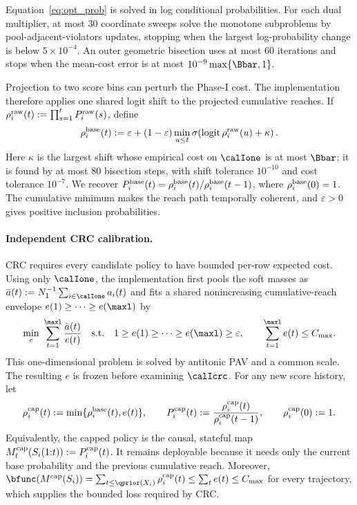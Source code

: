 Equation~\eqref{eq:opt_prob} is solved in log conditional probabilities. For
each dual multiplier, at most \(30\) coordinate sweeps solve the monotone
subproblems by pool-adjacent-violators updates, stopping when the largest
log-probability change is below \(5\times10^{-4}\). An outer geometric
bisection uses at most \(60\) iterations and stops when the mean-cost error is
at most \(10^{-9}\max\{\Bbar,1\}\).

Projection to two score bins can perturb the Phase-I cost. The implementation
therefore applies one shared logit shift to the projected cumulative reaches.
If \(\rho_i^{\rm raw}(t):=\prod_{s=1}^tP_i^{\rm raw}(s)\), define
\begin{equation}
    \rho_i^{\rm base}(t)
    :=\varepsilon+(1-\varepsilon)
      \min_{u\leq t}
      \sigma\!\left(\operatorname{logit}\rho_i^{\rm raw}(u)+\kappa\right).
    \label{eq:lpb_impl_cumulative_correction}
\end{equation}
Here \(\kappa\) is the largest shift whose empirical cost on \(\calIone\) is
at most \(\Bbar\); it is found by at most \(80\) bisection steps, with shift
tolerance \(10^{-10}\) and cost tolerance \(10^{-7}\). We recover
\(P_i^{\rm base}(t)=\rho_i^{\rm base}(t)/\rho_i^{\rm base}(t-1)\), where
\(\rho_i^{\rm base}(0)=1\). The cumulative minimum makes the reach path
temporally coherent, and \(\varepsilon>0\) gives positive inclusion
probabilities.

\paragraph{Independent CRC calibration.}
CRC requires every candidate policy to have bounded per-row expected cost.
Using only \(\calIone\), the implementation first pools the soft masses as
\(\bar a(t):=N_1^{-1}\sum_{i\in\calIone}a_i(t)\) and fits a shared
nonincreasing cumulative-reach envelope \(e(1)\geq\cdots\geq e(\maxl)\) by
\begin{equation}
    \min_e\ \sum_{t=1}^{\maxl}\frac{\bar a(t)}{e(t)}
    \quad\text{s.t.}\quad
    1\geq e(1)\geq\cdots\geq e(\maxl)\geq\varepsilon,
    \qquad \sum_{t=1}^{\maxl}e(t)\leq C_{\max}.
    \label{eq:lpb_impl_shared_envelope}
\end{equation}
This one-dimensional problem is solved by antitonic PAV and a common scale.
The resulting \(e\) is frozen before examining \(\calIcrc\). For any new
score history, let
\begin{equation}
    \rho_i^{\rm cap}(t)
      :=\min\{\rho_i^{\rm base}(t),e(t)\},
    \qquad
    P_i^{\rm cap}(t)
      :=\frac{\rho_i^{\rm cap}(t)}{\rho_i^{\rm cap}(t-1)},
    \qquad \rho_i^{\rm cap}(0):=1.
    \label{eq:lpb_impl_capped_policy}
\end{equation}
Equivalently, the capped policy is the causal, stateful map
\(M_t^{\rm cap}(S_i(1{:}t)):=P_i^{\rm cap}(t)\). It remains deployable
because it needs only the current base probability and the previous cumulative
reach. Moreover,
\(
\bfunc(M^{\rm cap}(S_i))
=\sum_{t\leq\qprior(X_i)}\rho_i^{\rm cap}(t)
\leq\sum_t e(t)\leq C_{\max}
\)
for every trajectory, which supplies the bounded loss required by CRC.

